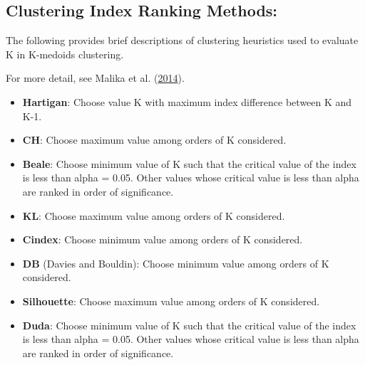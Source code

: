 \documentclass[twoside,12pt,final]{ucthesis-CA2012}
\providecommand{\tightlist}{%
  \setlength{\itemsep}{0pt}\setlength{\parskip}{0pt}}
\begin{document}
\begin{ucmainmatter}
\hypertarget{clustering-index-ranking-methods}{%
\subsection{Clustering Index Ranking Methods:}\label{clustering-index-ranking-methods}}

The following provides brief descriptions of clustering heuristics used to evaluate K in K-medoids clustering.

For more detail, see Malika et al. (\protect\hyperlink{ref-Charrad2014}{2014}).
\begin{itemize}
\tightlist
\item
  \textbf{Hartigan}: Choose value K with maximum index difference between K and K-1.
\item
  \textbf{CH}: Choose maximum value among orders of K considered.
\item
  \textbf{Beale}: Choose minimum value of K such that the critical value of the index is less than alpha = 0.05. Other values whose critical value is less than alpha are ranked in order of significance.
\item
  \textbf{KL}: Choose maximum value among orders of K considered.
\item
  \textbf{Cindex}: Choose minimum value among orders of K considered.
\item
  \textbf{DB} (Davies and Bouldin): Choose minimum value among orders of K considered.
\item
  \textbf{Silhouette}: Choose maximum value among orders of K considered.
\item
  \textbf{Duda}: Choose minimum value of K such that the critical value of the index is less than alpha = 0.05. Other values whose critical value is less than alpha are ranked in order of significance.
\end{itemize}
\pagebreak
\begin{table}[ht]
\centering
{}
\end{table}
\end{ucmainmatter}
\end{document}
